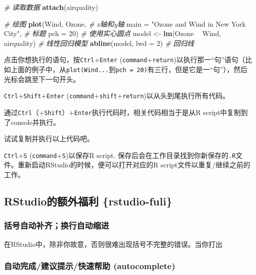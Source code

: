 \documentclass[]{book}
\newenvironment{Shaded}{\begin{snugshade}}{\end{snugshade}}
\newcommand{\CommentTok}[1]{\textcolor[rgb]{0.56,0.35,0.01}{\textit{#1}}}
\newcommand{\DataTypeTok}[1]{\textcolor[rgb]{0.13,0.29,0.53}{#1}}
\newcommand{\DecValTok}[1]{\textcolor[rgb]{0.00,0.00,0.81}{#1}}
\newcommand{\KeywordTok}[1]{\textcolor[rgb]{0.13,0.29,0.53}{\textbf{#1}}}
\newcommand{\NormalTok}[1]{#1}
\newcommand{\OperatorTok}[1]{\textcolor[rgb]{0.81,0.36,0.00}{\textbf{#1}}}
\newcommand{\StringTok}[1]{\textcolor[rgb]{0.31,0.60,0.02}{#1}}
\begin{document}
\begin{Shaded}
\begin{Highlighting}[]
\CommentTok{# 读取数据}
\KeywordTok{attach}\NormalTok{(airquality)}

\CommentTok{# 绘图}
\KeywordTok{plot}\NormalTok{(Wind, Ozone, }\CommentTok{# x轴和y轴}
     \DataTypeTok{main =} \StringTok{"Ozone and Wind in New York City"}\NormalTok{, }\CommentTok{# 标题}
     \DataTypeTok{pch =} \DecValTok{20}\NormalTok{) }\CommentTok{# 使用实心圆点}
\NormalTok{model <-}\StringTok{ }\KeywordTok{lm}\NormalTok{(Ozone }\OperatorTok{~}\StringTok{ }\NormalTok{Wind, airquality) }\CommentTok{# 线性回归模型}
\KeywordTok{abline}\NormalTok{(model, }\DataTypeTok{lwd =} \DecValTok{2}\NormalTok{) }\CommentTok{# 回归线}
\end{Highlighting}
\end{Shaded}

点击你想执行的语句，按\texttt{Ctrl}+\texttt{Enter} (\texttt{command}+\texttt{return})以执行那一``句''语句（比如上面的例子中，从\texttt{plot(Wind...}到\texttt{pch\ =\ 20)}有三行，但是它是一``句''），然后光标会跳至下一句开头。

\texttt{Ctrl}+\texttt{Shift}+\texttt{Enter} (\texttt{command}+\texttt{shift}+\texttt{return})以从头到尾执行所有代码。

通过\texttt{Ctrl}（+\texttt{Shift}）+\texttt{Enter}执行代码时，相关代码相当于是从R script中复制到了console并执行。

试试复制并执行以上代码吧。

\texttt{Ctrl}+\texttt{S} (\texttt{command}+\texttt{S})以保存R script. 保存后会在工作目录找到你新保存的\texttt{.R}文件。重新启动RStudio的时候，便可以打开对应的R script文件以重复/继续之前的工作。

\hypertarget{rstudio-rstudio-fuli}{%
\subsection{RStudio的额外福利 \{rstudio-fuli\}}\label{rstudio-rstudio-fuli}}

\subsubsection{括号自动补齐；换行自动缩进}

在RStudio中，除非你故意，否则很难出现括号不完整的错误。当你打出

\hypertarget{autocomplete}{%
\subsubsection{自动完成/建议提示/快速帮助 (autocomplete)}\label{autocomplete}}
\end{document}
